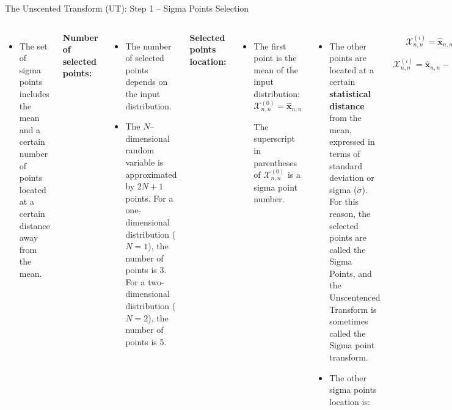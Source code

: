\begin{frame}{The Unscented Transform (UT): Step 1 – Sigma Points Selection}
\begin{columns}
\vspace{-30pt}

\begin{itemize}
    \item The set of sigma points includes the mean and a certain number of points located at a certain distance away from the mean.
\end{itemize}
\textbf{Number of selected points:}
\begin{itemize}
    \item The number of selected points depends on the input distribution. 

    \item The $N$--dimensional random variable is approximated by $2N+1$ points. For a one-dimensional distribution ($N = 1$), the number of points is 3. For a two-dimensional distribution ($N = 2$), the number of points is 5.
\end{itemize}
\textbf{Selected points location:}
\begin{itemize}
 \item The first point is the mean of the input distribution:
\[ \mathcal{X}^{(0)}_{n,n} = \hat{\mathbf{x}}_{n,n}\]

The superscript in parentheses of \(\mathcal{X}^{(0)}_{n,n}\) is a sigma point number.
\end{itemize}
\begin{itemize}
    \item The other points are located at a certain \textbf{statistical distance} from the mean, expressed in terms of standard deviation or sigma ($\sigma$). For this reason, the selected points are called the Sigma Points, and the Unscentenced Transform is sometimes called the Sigma point transform.
    \item The other sigma points location is:
\end{itemize}    
    \[
    \mathcal{X}^{(i)}_{n,n} \!=\! \hat{\mathbf{x}}_{n,n} + \left(\sqrt{(N + \kappa) \mathbf{P}_{n,n}}\right)_i, \quad i = 1, \cdots ,N
    \]
    \[
    \mathcal{X}^{(i)}_{n,n} \!=\! \hat{\mathbf{x}}_{n,n} - \left(\!\sqrt{(N + \kappa) \mathbf{P}_{n,n}}\right)_{i-N}, i \!=\! N + 1,\cdots, 2N
    \]
\vspace{-5pt}    
\begin{itemize}
    \item \(N\) is the number of dimensions
    \item \(\kappa\) is a tuning parameter
    \item \(\sqrt{(N + \kappa) \mathbf{P}_{n,n}}_i\) is the \(i\)-th row or column of the matrix square root of \(\sqrt{(N + \kappa) \mathbf{P}_{n,n}}\)
\end{itemize}
For Gaussian distribution, the rule of thumb is to set: \(N + \kappa = 3\). The sigma points should be chosen so that they capture the most important statistical properties of the prior random variable \(\hat{\mathbf{x}}\).
\end{columns}
\end{frame}

